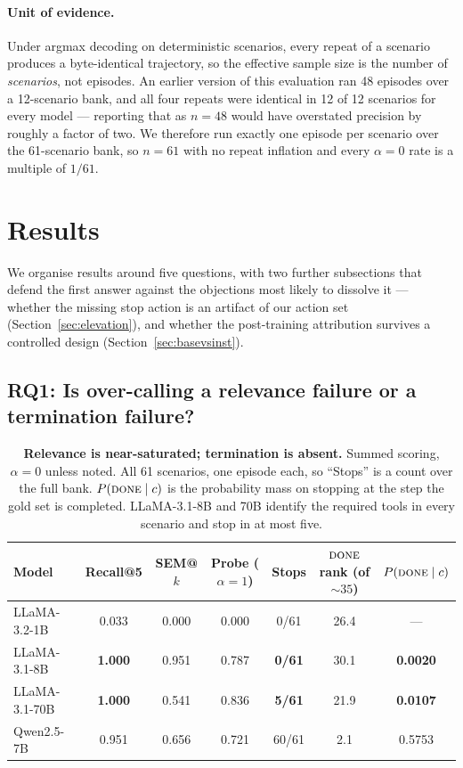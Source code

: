 \documentclass[11pt]{article}
\newcommand{\done}{\ensuremath{\text{\textsc{done}}}}
\begin{document}
\paragraph{Unit of evidence.}
Under arg\-max decoding on deterministic scenarios, every repeat of a scenario
produces a byte-identical trajectory, so the effective sample size is the number of
\emph{scenarios}, not episodes. An earlier version of this evaluation ran 48 episodes
over a 12-scenario bank, and all four repeats were identical in 12 of 12 scenarios
for every model --- reporting that as $n=48$ would have overstated precision by
roughly a factor of two. We therefore run exactly one episode per scenario over the
61-scenario bank, so $n=61$ with no repeat inflation and every $\alpha=0$ rate is a
multiple of $1/61$.

\section{Results}

We organise results around five questions, with two further subsections that
defend the first answer against the objections most likely to dissolve it ---
whether the missing stop action is an artifact of our action set
(Section~\ref{sec:elevation}), and whether the post-training attribution survives
a controlled design (Section~\ref{sec:basevsinst}).

\subsection{RQ1: Is over-calling a relevance failure or a termination failure?}
\label{sec:dissociation}

\begin{table}[t]
\centering
\caption{\textbf{Relevance is near-saturated; termination is absent.} Summed
scoring, $\alpha=0$ unless noted. All 61 scenarios, one episode each, so ``Stops''
is a count over the full bank. $P(\done\mid c)$ is the probability
mass on stopping at the step the gold set is completed. LLaMA-3.1-8B and 70B
identify the required tools in every scenario and stop in at most five.}
\label{tab:llm}
\begin{tabular}{lcccccc}
\toprule
Model & Recall@5 & SEM@$k$ & Probe ($\alpha{=}1$) & Stops & $\done$ rank (of ${\sim}35$) & $P(\done\mid c)$ \\
\midrule
LLaMA-3.2-1B   & 0.033 & 0.000 & 0.000 & 0/61 & 26.4 & --- \\
LLaMA-3.1-8B   & \textbf{1.000} & 0.951 & 0.787 & \textbf{0/61} & 30.1 & \textbf{0.0020} \\
LLaMA-3.1-70B  & \textbf{1.000} & 0.541 & 0.836 & \textbf{5/61} & 21.9 & \textbf{0.0107} \\
Qwen2.5-7B     & 0.951 & 0.656 & 0.721 & 60/61 & 2.1 & 0.5753 \\
\bottomrule
\end{tabular}
\end{table}
\end{document}
